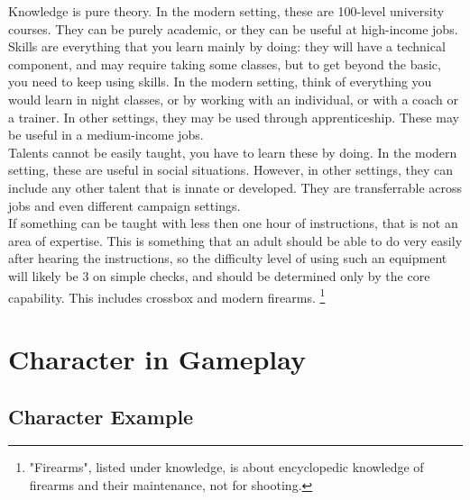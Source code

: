 \documentclass{LegrandOrangeTufteBook}
\newcommand{\term}[1]{\textcolor{colorTerm}{#1}}
\begin{document}


\term{Knowledge} is pure theory. In the modern setting, these are 100-level university courses. They can be purely academic, or they can be useful at high-income jobs.\\
\term{Skills} are everything that you learn mainly by doing:
they will have a technical component, and may require taking some classes, but to get beyond the basic, you need to keep using skills.
In the modern setting, think of everything you would learn in night classes, or by working with an individual, or with a coach or a trainer.
In other settings, they may be used through apprenticeship.
These may be useful in a medium-income jobs.\\
\term{Talents} cannot be easily taught, you have to learn these by doing.
In the modern setting, these are useful in social situations.
However, in other settings, they can include any other talent that is innate or developed.
They are transferrable across jobs and even different campaign settings.\\

If something can be taught with less then one hour of instructions, that is not an area of \term{expertise}.
This is something that an adult should be able to do very easily after hearing the instructions,
so the \term{difficulty level} of using such an equipment will likely be 3 on simple checks,
and should be determined only by the \term{core capability}.
This includes crossbox and modern firearms.
\footnote{"Firearms", listed under knowledge, is about encyclopedic knowledge of firearms and their maintenance, not for shooting.}





\section*{Character in Gameplay}

\subsection*{Character Example}
\end{document}
